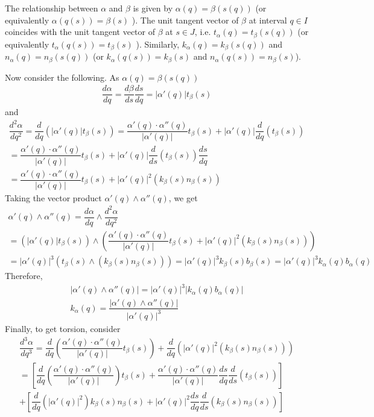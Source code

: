 \documentclass{article}
\begin{document}
	The relationship between $\alpha$ and $\beta$ is given by $\alpha(q) = \beta(s(q))$ (or equivalently $\alpha(q(s)) = \beta(s)$ ). The unit tangent vector of $\beta$ at interval $q \in I$ coincides with the unit tangent vector of $\beta$ at $s \in J$, i.e. $t_{\alpha}(q) = t_{\beta}(s(q))$ (or equivalently $t_{\alpha}(q(s)) = t_{\beta}(s)$ ). Similarly, $k_{\alpha}(q) = k_{\beta}(s(q))$ and $n_{\alpha}(q) = n_{\beta}(s(q))$ (or $k_{\alpha}(q(s)) = k_{\beta}(s)$ and $n_{\alpha}(q(s)) = n_{\beta}(s)$). 

	Now consider the following. As $\alpha(q) = \beta(s(q))$
	\begin{gather*}
		\dfrac{d\alpha}{dq} = \dfrac{d\beta}{ds} \dfrac{ds}{dq} = |\alpha'(q)| t_{\beta}(s)
	\end{gather*}
	and
	\begin{gather*}
		\dfrac{d^2\alpha}{dq^2} = \dfrac{d}{dq} \left( |\alpha'(q)| t_{\beta}(s) \right)
		= \dfrac{\alpha'(q) \cdot \alpha''(q)}{|\alpha'(q)|} t_{\beta}(s) + |\alpha'(q)| \dfrac{d}{dq} (t_{\beta}(s)) \\
		= \dfrac{\alpha'(q) \cdot \alpha''(q)}{|\alpha'(q)|} t_{\beta}(s) + |\alpha'(q)| \dfrac{d}{ds} (t_{\beta}(s)) \dfrac{ds}{dq} \\
		= \dfrac{\alpha'(q) \cdot \alpha''(q)}{|\alpha'(q)|} t_{\beta}(s) + |\alpha'(q)|^2 \left( k_{\beta}(s) n_{\beta}(s) \right)
	\end{gather*}
	Taking the vector product $\alpha'(q) \wedge \alpha''(q)$, we get
	\begin{gather*}
		\alpha'(q) \wedge \alpha''(q) = \dfrac{d\alpha}{dq} \wedge \dfrac{d^2\alpha}{dq^2} \\
		= \left( |\alpha'(q)| t_{\beta}(s) \right) \wedge \left( \dfrac{\alpha'(q) \cdot \alpha''(q)}{|\alpha'(q)|} t_{\beta}(s) + |\alpha'(q)|^2 \left( k_{\beta}(s) n_{\beta}(s) \right) \right) \\
		= |\alpha'(q)|^3 \left( t_{\beta}(s) \wedge \left( k_{\beta}(s) n_{\beta}(s) \right) \right) = |\alpha'(q)|^3 k_{\beta}(s) b_{\beta}(s) = |\alpha'(q)|^3 k_{\alpha}(q) b_{\alpha}(q)
	\end{gather*}
	Therefore,
	\begin{gather*}
		\left| \alpha'(q) \wedge \alpha''(q) \right| = |\alpha'(q)|^3 \left| k_{\alpha}(q) b_{\alpha}(q) \right| \\
		k_{\alpha}(q) = \dfrac{ \left| \alpha'(q) \wedge \alpha''(q) \right| }{ |\alpha'(q)|^3}
	\end{gather*}
	Finally, to get torsion, consider
	\begin{gather*}
		\dfrac{d^3\alpha}{dq^3} = \dfrac{d}{dq} \left( \dfrac{\alpha'(q) \cdot \alpha''(q)}{|\alpha'(q)|} t_{\beta}(s) \right) + \dfrac{d}{dq} \left( |\alpha'(q)|^2 \left( k_{\beta}(s) n_{\beta}(s) \right) \right) \\
		= \left[ \dfrac{d}{dq} \left( \dfrac{\alpha'(q) \cdot \alpha''(q)}{|\alpha'(q)|} \right) t_{\beta}(s) + \dfrac{\alpha'(q) \cdot \alpha''(q)}{|\alpha'(q)|} \dfrac{ds}{dq} \dfrac{d}{ds}(t_{\beta}(s)) \right] \\
		+ \left[ \dfrac{d}{dq} \left( |\alpha'(q)|^2 \right) k_{\beta}(s) n_{\beta}(s) + |\alpha'(q)|^2 \dfrac{ds}{dq} \dfrac{d}{ds} \left( k_{\beta}(s) n_{\beta}(s) \right) \right]
	\end{gather*}
\end{document}

